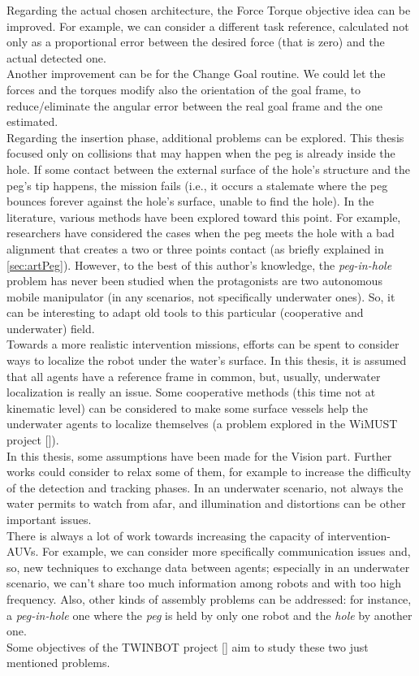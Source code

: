 Regarding the actual chosen architecture, the Force Torque objective idea can be improved. For example, we can consider a different task reference, calculated not only as a proportional error between the desired force (that is zero) and the actual detected one.\\
Another improvement can be for the Change Goal routine. We could let the forces and the torques modify also the orientation of the goal frame, to reduce/eliminate the angular error between the real goal frame and the one estimated.\\

Regarding the insertion phase, additional problems can be explored. This thesis focused only on collisions that may happen when the peg is already inside the hole. If some contact between the external surface of the hole's structure and the peg's tip happens, the mission fails (i.e., it occurs a stalemate where the peg bounces forever against the hole's surface, unable to find the hole). In the literature, various methods have been explored toward this point. For example, researchers have considered the cases when the peg meets the hole with a bad alignment that creates a two or three points contact (as briefly explained in \ref{sec:artPeg}). However, to the best of this author's knowledge, the \textit{peg-in-hole} problem has never been studied when the protagonists are two autonomous mobile manipulator (in any scenarios, not specifically underwater ones). So, it can be interesting to adapt old tools to this particular (cooperative and underwater) field.\\

Towards a more realistic intervention missions, efforts can be spent to consider ways to localize the robot under the water's surface. In this thesis, it is assumed that all agents have a reference frame in common, but, usually, underwater localization is really an issue. Some cooperative methods (this time not at kinematic level) can be considered to make some surface vessels help the underwater agents to localize themselves (a problem explored in the WiMUST project [\cite{wimust}]).\\

In this thesis, some assumptions have been made for the Vision part. Further works could consider to relax some of them, for example to increase the difficulty of the detection and tracking phases. In an underwater scenario, not always the water permits to watch from afar, and illumination and distortions can be other important issues.\\

There is always a lot of work towards increasing the capacity of \mbox{intervention-AUVs}. For example, we can consider more specifically communication issues and, so, new techniques to exchange data between agents; especially in an underwater scenario, we can't share too much information among robots and with too high frequency. Also, other kinds of assembly problems can be addressed: for instance, a \textit{peg-in-hole} one where the \textit{peg} is held by only one robot and the \textit{hole} by another one.\\ Some objectives of the TWINBOT project [\cite{TWINBOT2019}] aim to study these two just mentioned problems.

